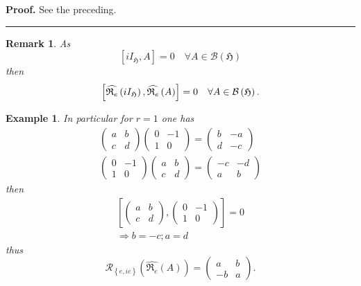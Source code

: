 \documentclass[aps,preprint]{revtex4}
\newtheorem{example}[theorem]{Example}
\newtheorem{remark}[theorem]{Remark}
\newenvironment{proof}[1][Proof]{\noindent\textbf{#1.} }{\ \rule{0.5em}{0.5em}}
\begin{document}
\begin{proof}
See the preceding.
\end{proof}

\begin{remark}
As 
\begin{equation}
\left[ iI_{\mathfrak{H}},A\right] =0\quad \forall A\in \mathcal{B}\left( 
\mathfrak{H}\right)
\end{equation}%
then 
\begin{equation}
\left[ \widehat{\mathfrak{R}_{e}}\left( iI_{\mathfrak{H}}\right) ,\widehat{%
\mathfrak{R}_{e}}\left( A\right) \right] =0\quad \forall A\in \mathcal{B}%
\left( \mathfrak{H}\right) .
\end{equation}
\end{remark}

\begin{example}
In particular for $r=1$ one has 
\begin{gather}
\left( 
\begin{array}{cc}
a & b \\ 
c & d%
\end{array}%
\right) \left( 
\begin{array}{cc}
0 & -1 \\ 
1 & 0%
\end{array}%
\right) =\left( 
\begin{array}{cc}
b & -a \\ 
d & -c%
\end{array}%
\right) \\
\left( 
\begin{array}{cc}
0 & -1 \\ 
1 & 0%
\end{array}%
\right) \left( 
\begin{array}{cc}
a & b \\ 
c & d%
\end{array}%
\right) =\left( 
\begin{array}{cc}
-c & -d \\ 
a & b%
\end{array}%
\right)
\end{gather}%
then%
\begin{gather}
\left[ \left( 
\begin{array}{cc}
a & b \\ 
c & d%
\end{array}%
\right) ,\left( 
\begin{array}{cc}
0 & -1 \\ 
1 & 0%
\end{array}%
\right) \right] =0 \\
\Rightarrow b=-c;a=d
\end{gather}%
thus%
\begin{equation}
\mathcal{R}_{\left\{ e,ie\right\} }\left( \widehat{\mathfrak{R}_{e}}\left(
A\right) \right) =\left( 
\begin{array}{cc}
a & b \\ 
-b & a%
\end{array}%
\right) .
\end{equation}
\end{example}
\end{document}
